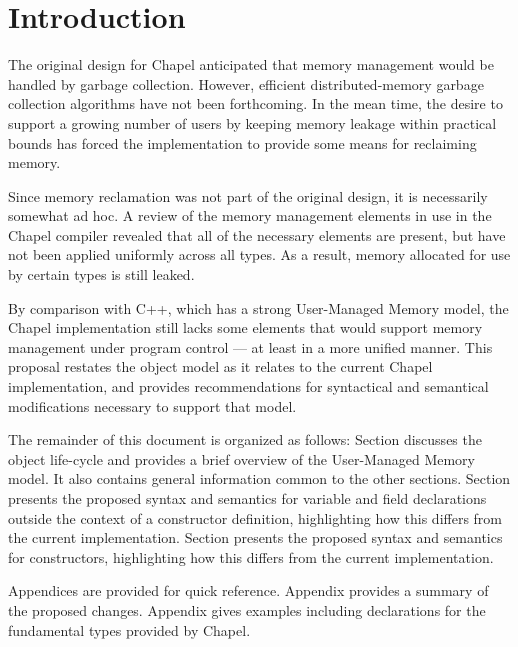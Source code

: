 \section{Introduction}

The original design for Chapel anticipated that memory management would be handled
by garbage collection.  However, efficient distributed-memory garbage collection
algorithms have not been forthcoming.  In the mean time, the desire to support a growing
number of users by keeping memory leakage within practical bounds has forced the
implementation to provide some means for reclaiming memory.  

Since memory reclamation was not part of the original design, it is necessarily somewhat
ad hoc.  A review of the memory management elements in use in the Chapel compiler revealed
that all of the necessary elements are present, but have not been applied uniformly across
all types.  As a result, memory allocated for use by certain types is still leaked.

By comparison with C++, which has a strong User-Managed Memory model, the Chapel
implementation still lacks some elements that would support memory management under
program control --- at least in a more unified manner.  This proposal restates the object
model as it relates to the current Chapel implementation, and provides recommendations for
syntactical and semantical modifications necessary to support that model.

The remainder of this document is organized as follows: Section  discusses
the object life-cycle and provides a brief overview of the User-Managed Memory model.  It
also contains general information common to the other sections.  Section
 presents the proposed syntax and semantics for variable and field
declarations outside the context of a constructor definition, highlighting how this
differs from the current implementation.  Section  presents the
proposed syntax and semantics for constructors, highlighting how this differs from the
current implementation.

Appendices are provided for quick reference.  Appendix  provides a summary of the
proposed changes.  Appendix  gives examples including declarations for the
fundamental types provided by Chapel.

